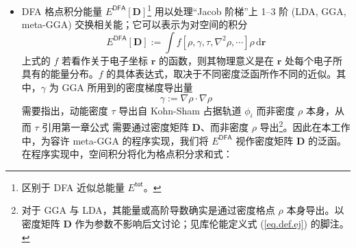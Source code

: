 \begin{itemize}[nosep]
\begin{equation}
        \end{equation}
        部分泛函在交换能部分考虑了长短程效应；长程 (LR, \underline{L}ong-\underline{R}ange) 部分能量 $E_\mathrm{x}^\textsf{LR}$ 的双电子除了积分算符通常是 $\mathrm{erf} (\mu r_{12}) / r_{12}$\footnote{$\mu$ 是长程矫正的参数，通常小于 1。对于长程矫正作用，使用误差函数 $\mathrm{erf} (\mu r_{12}) / r_{12}$ 是常见且最多程序实现的方法；但除此之外，Yukawa 衰减算符 $\mathrm{exp} (-\mu r_{12}) / r_{12}$\cite{Savin-Flad.IJQC.1995} 与 $\mathrm{terf}$ 函数 $$\mathrm{terf} (r, r_0) := \frac{1}{2} \left( \mathrm{erf} \left(\frac{r - r_0}{\sqrt{2} r_0}\right) + \mathrm{erf} \left(\frac{r + r_0}{\sqrt{2} r_0}\right) \right)$$ 所构成的衰减算符 $\mathrm{terf} (-\mu r_{12}) / r_{12}$\cite{Goldey-Head-Gordon.PCCP.2013}，也是其它可能使用到的长程矫正方案。}，在计算、程序调用、张量分解等具体的程序实现上等同于严格交换能 $E_\mathrm{x}^\textsf{exact}$\footnote{需要指出，这只是双电子能量积分的一种表达方法。以 Cammi 等\cite{Cammi-Frisch.TCA.2004}对溶剂化模型下 MP2 二阶梯度理论为例，该文将电子效应诱导的溶剂化能量与双电子积分能量合并处理；而溶剂化能量的计算本身是不具有双电子积分。同时，在以较为抽象的层面上推导二阶梯度问题时，DFA 格点积分能量 $E^\textsf{DFA} [\mathbf{D}]$ 与双电子积分有类似的推演过程；因此从梯度理论的角度来讲，拆分双电子积分能量 $E^\textsf{ERI}$ 与 DFA 格点积分能量 $E^\textsf{DFA}$ 是人为的。在本工作中，我们不涉及溶剂化、基于密度的长程弥散矫正等其它无法简单纳入单电子积分能量的贡献；因此从程序实现方便、或计算量差异的角度，拆分了双电子积分能量与 DFA 格点积分能量。}。
  \item DFA 格点积分能量 $E^\textsf{DFA} [\mathbf{D}]$\footnote{区别于 DFA 近似总能量 $E^\textsf{tot}$。} 用以处理“Jacob 阶梯”上 1--3 阶 (LDA, GGA, meta-GGA) 交换相关能；它可以表示为对空间的积分
        \begin{equation}
          E^\textsf{DFA} [\mathbf{D}] := \int f[\rho, \gamma, \tau, \nabla^2 \rho, \cdots] \rho \, \mathrm{d} \bm{r}
        \end{equation}
        上式的 $f$ 若看作关于电子坐标 $\bm{r}$ 的函数，则其物理意义是在 $\bm{r}$ 处每个电子所具有的能量分布。$f$ 的具体表达式，取决于不同密度泛函所作不同的近似。其中，$\gamma$ 为 GGA 所用到的密度梯度导出量
        \begin{equation}
          \gamma := \nabla \rho \cdot \nabla \rho
        \end{equation}
        需要指出，动能密度 $\tau$ 导出自 Kohn-Sham 占据轨道 $\phi_i$ 而非密度 $\rho$ 本身，从而 $\tau$ \alert{引用第一章公式} 需要通过密度矩阵 $\mathbf{D}$、而非密度 $\rho$ 导出\footnote{对于 GGA 与 LDA，其能量或高阶导数确实是通过密度格点 $\rho$ 本身导出。以密度矩阵 $\mathbf{D}$ 作为参数不影响后文讨论；见库伦能定义式 (\ref{eq.def.ej}) 的脚注。}。因此在本工作中，为容许 meta-GGA 的程序实现，我们将 $E^\textsf{DFA}$ 视作密度矩阵 $\mathbf{D}$ 的泛函。在程序实现中，空间积分将化为格点积分求和式：

\end{itemize}

